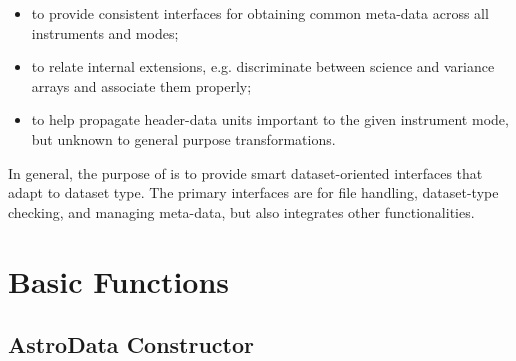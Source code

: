 \documentclass[letterpaper,10pt,english]{sphinxmanual}
\begin{document}
\begin{fulllineitems}
\begin{itemize}
\item {} 
to provide consistent interfaces for obtaining common meta-data across all
instruments and modes;

\item {} 
to relate internal extensions, e.g. discriminate between science and 
variance arrays and associate them properly;

\item {} 
to help propagate header-data units important to the given instrument mode,
but unknown to general purpose transformations.

\end{itemize}

In general, the purpose of  is to provide smart dataset-oriented interfaces
that adapt to dataset type. The primary interfaces are for file
handling, dataset-type checking, and managing meta-data, but  also
integrates other functionalities.

\end{fulllineitems}



\section{Basic Functions}
\label{chapter_AstroDataClass:basic-functions}

\subsection{AstroData Constructor}
\label{chapter_AstroDataClass:astrodata-constructor}
\end{document}
